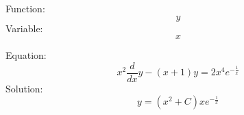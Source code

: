 \documentclass{article}
\begin{document}
Function:
$$
y
$$
Variable:
$$
x
$$

Equation:
$$
x^2 \frac{d}{dx}y-(x+1)y=2x^4 e^{-\frac{1}{x}}
$$
Solution:
$$
y=(x^2+C)xe^{-\frac{1}{x}}
$$
\end{document}
